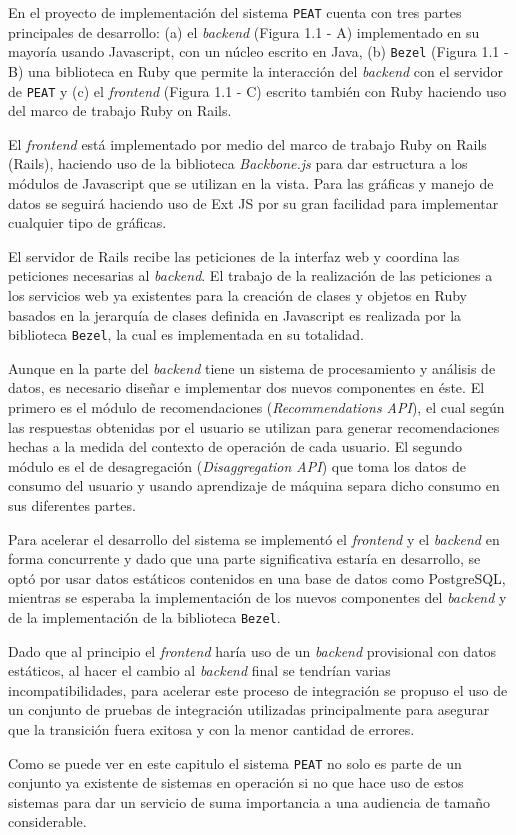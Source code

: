 En el proyecto de implementación del sistema \texttt{PEAT}
cuenta con tres partes principales de desarrollo:
(a) el \textit{backend} (Figura 1.1 - A) implementado en su mayoría usando
Javascript, con un núcleo escrito en Java, (b) \texttt{Bezel} (Figura 1.1 - B)
una biblioteca en Ruby que permite la interacción del \textit{backend}
con el servidor de \texttt{PEAT} y (c) el \textit{frontend} (Figura 1.1 - C) escrito
también con Ruby haciendo uso del marco de trabajo Ruby on Rails.


El \textit{frontend} está implementado por medio del marco de trabajo
Ruby on Rails (Rails), haciendo uso de la biblioteca \textit{Backbone.js}
para dar estructura a los módulos de Javascript que se utilizan en la vista.
Para las gráficas y manejo de datos se seguirá haciendo uso de Ext JS
por su gran facilidad para implementar cualquier tipo de gráficas.

El servidor de Rails recibe las peticiones de la interfaz web y
coordina las peticiones necesarias al \textit{backend}. El trabajo
de la realización de las peticiones a los servicios web ya existentes para la
creación de clases y objetos en Ruby basados en la jerarquía de clases
definida en Javascript es realizada por la biblioteca \texttt{Bezel},
la cual es implementada en su totalidad.

Aunque en la parte del \textit{backend} tiene un sistema de procesamiento
y análisis de datos, es necesario diseñar e implementar dos nuevos componentes
en éste. El primero es el módulo de recomendaciones (\textit{Recommendations API}),
el cual según las respuestas obtenidas por el usuario se utilizan para generar
recomendaciones hechas a la medida del contexto de operación de cada usuario.
El segundo módulo es el de desagregación (\textit{Disaggregation API}) que toma los
datos de consumo del usuario y usando aprendizaje de máquina separa dicho consumo
en sus diferentes partes.

Para acelerar el desarrollo del sistema se implementó el \textit{frontend}
y el \textit{backend} en forma concurrente y dado que una parte significativa
estaría en desarrollo, se optó por usar datos estáticos contenidos
en una base de datos como PostgreSQL, mientras se esperaba la implementación
de los nuevos componentes del \textit{backend} y de la implementación de la
biblioteca \texttt{Bezel}.

Dado que al principio el \textit{frontend} haría uso de un \textit{backend}
provisional con datos estáticos, al hacer el cambio al \textit{backend} final
se tendrían varias incompatibilidades, para acelerar este proceso de integración
se propuso el uso de un conjunto de pruebas de integración utilizadas
principalmente para asegurar que la transición fuera exitosa y con la menor
cantidad de errores.

Como se puede ver en este capitulo el sistema \texttt{PEAT} no solo es parte de
un conjunto ya existente de sistemas en operación si no que hace uso de estos
sistemas para dar un servicio de suma importancia a una audiencia de tamaño
considerable.

